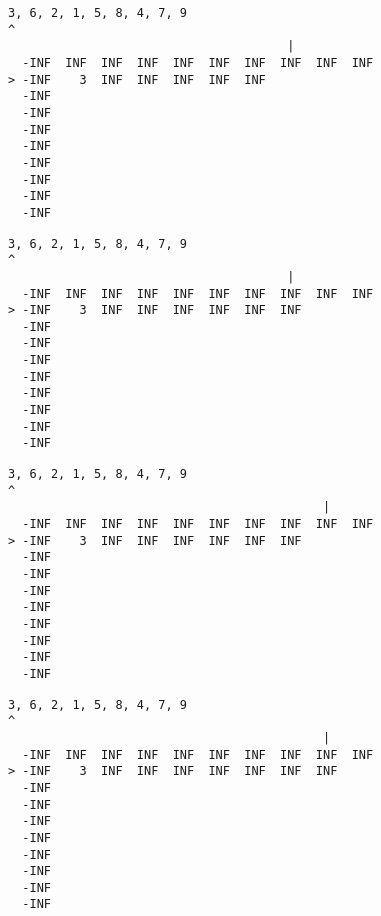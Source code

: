 { \begin{verbatim}
3, 6, 2, 1, 5, 8, 4, 7, 9
^
                                       |
  -INF  INF  INF  INF  INF  INF  INF  INF  INF  INF
> -INF    3  INF  INF  INF  INF  INF               
  -INF                                             
  -INF                                             
  -INF                                             
  -INF                                             
  -INF                                             
  -INF                                             
  -INF                                             
  -INF                                             
\end{verbatim} }

{ \begin{verbatim}
3, 6, 2, 1, 5, 8, 4, 7, 9
^
                                       |
  -INF  INF  INF  INF  INF  INF  INF  INF  INF  INF
> -INF    3  INF  INF  INF  INF  INF  INF          
  -INF                                             
  -INF                                             
  -INF                                             
  -INF                                             
  -INF                                             
  -INF                                             
  -INF                                             
  -INF                                             
\end{verbatim} }

{ \begin{verbatim}
3, 6, 2, 1, 5, 8, 4, 7, 9
^
                                            |
  -INF  INF  INF  INF  INF  INF  INF  INF  INF  INF
> -INF    3  INF  INF  INF  INF  INF  INF          
  -INF                                             
  -INF                                             
  -INF                                             
  -INF                                             
  -INF                                             
  -INF                                             
  -INF                                             
  -INF                                             
\end{verbatim} }

{ \begin{verbatim}
3, 6, 2, 1, 5, 8, 4, 7, 9
^
                                            |
  -INF  INF  INF  INF  INF  INF  INF  INF  INF  INF
> -INF    3  INF  INF  INF  INF  INF  INF  INF     
  -INF                                             
  -INF                                             
  -INF                                             
  -INF                                             
  -INF                                             
  -INF                                             
  -INF                                             
  -INF                                             
\end{verbatim} }

